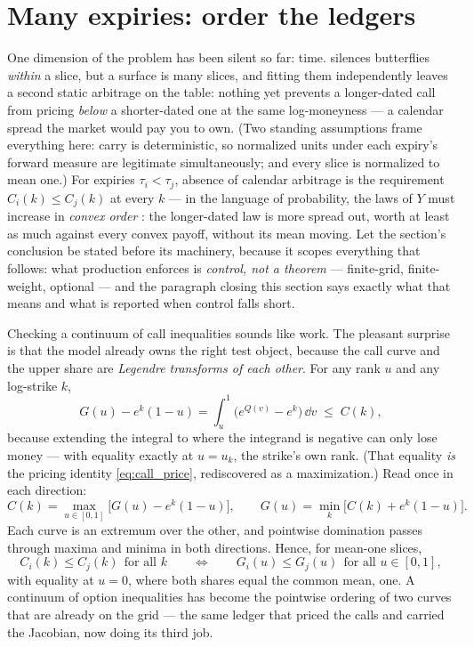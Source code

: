 \documentclass[11pt]{article}
\begin{document}
\section{Many expiries: order the ledgers}
\label{sec:calendar}

One dimension of the problem has been silent so far: time.
 silences butterflies \emph{within} a slice, but a
surface is many slices, and fitting them independently leaves a second
static arbitrage on the table: nothing yet prevents a longer-dated call from
pricing \emph{below} a shorter-dated one at the same log-moneyness --- a
calendar spread the market would pay you to own.  (Two standing assumptions
frame everything here: carry is deterministic, so normalized units under
each expiry's forward measure are legitimate simultaneously; and every slice
is normalized to mean one.)  For expiries $\tau_i<\tau_j$, absence of
calendar arbitrage is the requirement $C_i(k)\le C_j(k)$ at every $k$ ---
in the language of probability, the laws of $Y$ must increase in
\emph{convex order} \cite{Strassen1965}: the longer-dated law is more
spread out, worth at least as much against every convex payoff, without its
mean moving.  Let the section's conclusion be stated before its machinery,
because it scopes everything that follows: what production enforces is
\emph{control, not a theorem} --- finite-grid, finite-weight, optional ---
and the paragraph closing this section says exactly what that means and
what is reported when control falls short.

Checking a continuum of call inequalities sounds like work.  The pleasant
surprise is that the model already owns the right test object, because the
call curve and the upper share are \emph{Legendre transforms of each
other}.  For any rank $u$ and any log-strike $k$,
\begin{equation}
G(u)-e^{k}(1-u)
=\int_u^1\big(e^{Q(v)}-e^{k}\big)\,\dd v
\;\le\;C(k),
\end{equation}
because extending the integral to where the integrand is negative can only
lose money --- with equality exactly at $u=u_k$, the strike's own rank.
(That equality \emph{is} the pricing identity \eqref{eq:call_price},
rediscovered as a maximization.)  Read once in each direction:
\begin{equation}
C(k)=\max_{u\in[0,1]}\big[G(u)-e^{k}(1-u)\big],
\qquad
G(u)=\min_{k}\big[C(k)+e^{k}(1-u)\big].
\label{eq:legendre_dual}
\end{equation}
Each curve is an extremum over the other, and pointwise domination passes
through maxima and minima in both directions.  Hence, for mean-one slices,
\begin{equation}
C_i(k)\le C_j(k)\ \ \text{for all }k
\qquad\Longleftrightarrow\qquad
G_i(u)\le G_j(u)\ \ \text{for all }u\in[0,1],
\label{eq:calendar}
\end{equation}
with equality at $u=0$, where both shares equal the common mean, one.  A
continuum of option inequalities has become the pointwise ordering of two
curves that are already on the grid --- the same ledger that priced the
calls and carried the Jacobian, now doing its third job.
\end{document}
